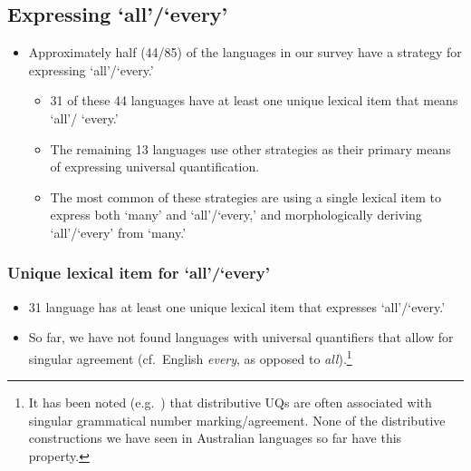 \documentclass{article}
\makeatletter
\newcommand{\ofy}{/85} %
\makeatother
\begin{document}

\subsection{Expressing `all'/`every'}
\begin{itemize}
\item Approximately half (44\ofy) of the languages in our survey have a strategy for expressing `all'/`every.'
  \begin{itemize}
  \item 31 of these 44 languages have at least one unique lexical item that means `all'/ `every.'
  \item The remaining 13 languages use other strategies as their primary means of expressing universal quantification.
  \item The most common of these strategies are using a single lexical item to express both `many' and `all'/`every,' and morphologically deriving `all'/`every' from `many.'
  \end{itemize}
\end{itemize}

\subsubsection{Unique lexical item for `all'/`every'}
\begin{itemize}
\item 31 language has at least one unique lexical item that expresses `all'/`every.'
\item So far, we have not found languages with universal quantifiers that allow for singular agreement (cf.\ English \textit{every}, as opposed to \textit{all}).\footnote{It has been noted (e.g.\ \cite[327--8]{gil95}) that distributive UQs are often associated with singular grammatical number marking/agreement. None of the distributive constructions we have seen in Australian languages so far have this property.}
\end{itemize}
\end{document}
